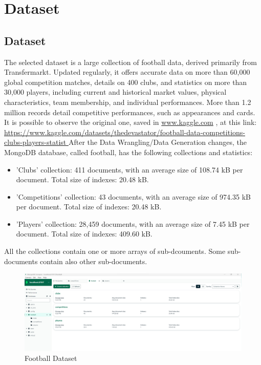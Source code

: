 \documentclass{Configuration_Files/PoliMi3i_thesis}
\begin{document}
\chapter{Dataset}
\label{ch:chapter_three}%

\section{Dataset}
The selected dataset is a large collection of football data, derived primarily from Transfermarkt. Updated regularly, it offers accurate data on more than 60,000 global competition matches, details on 400 clubs, and statistics on more than 30,000 players, including current and historical market values, physical characteristics, team membership, and individual performances. More than 1.2 million records detail competitive performances, such as appearances and cards. It is possible to observe the original one, saved in \url{www.kaggle.com} , at this link:
\url{https://www.kaggle.com/datasets/thedevastator/football-data-competitions-clubs-players-statist }
After the Data Wrangling/Data Generation changes, the MongoDB database, called football, has the following collections and statistics:
\begin{itemize}
    \item 'Clubs' collection: 411 documents, with an average size of 108.74 kB per document. Total size of indexes: 20.48 kB.
    \item 'Competitions' collection: 43 documents, with an average size of 974.35 kB per document. Total size of indexes: 20.48 kB.
    \item 'Players' collection: 28,459  documents, with an average size of 7.45 kB per document. Total size of indexes: 409.60 kB.
\end{itemize}
All the collections contain one or more arrays of sub-dcouments. Some sub-documents contain also other sub-documents.

\begin{figure}[htbp]
    \centering
    \includegraphics[scale=0.45]{Images/Dataset/football.png}
    \caption{Football Dataset}
\end{figure}
\newpage
\end{document}

